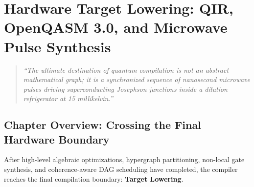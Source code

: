 \chapter{Hardware Target Lowering: QIR, OpenQASM 3.0, and Microwave Pulse Synthesis}
\label{ch:hardware_qir_openqasm}

\begin{quote}
\textit{``The ultimate destination of quantum compilation is not an abstract mathematical graph; it is a synchronized sequence of nanosecond microwave pulses driving superconducting Josephson junctions inside a dilution refrigerator at 15 millikelvin.''}
\end{quote}

\section*{Chapter Overview: Crossing the Final Hardware Boundary}

After high-level algebraic optimizations, hypergraph partitioning, non-local gate synthesis, and coherence-aware DAG scheduling have completed, the compiler reaches the final compilation boundary: \textbf{Target Lowering}.

